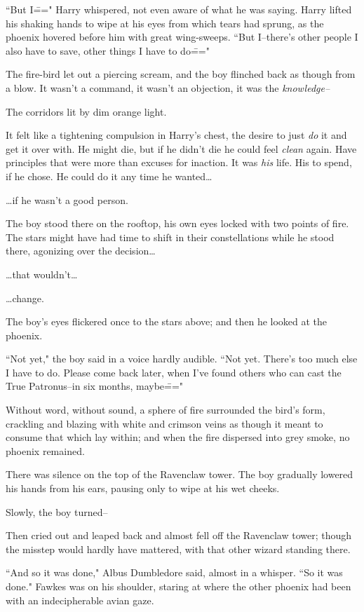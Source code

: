 ``But I\===" Harry whispered, not even aware of what he was saying. Harry lifted his shaking hands to wipe at his eyes from which tears had sprung, as the phoenix hovered before him with great wing-sweeps. ``But I\---there's other people I also have to save, other things I have to do\==="

The fire-bird let out a piercing scream, and the boy flinched back as though from a blow. It wasn't a command, it wasn't an objection, it was the \emph{knowledge\---}

The corridors lit by dim orange light.

It felt like a tightening compulsion in Harry's chest, the desire to just \emph{do} it and get it over with. He might die, but if he didn't die he could feel \emph{clean} again. Have principles that were more than excuses for inaction. It was \emph{his} life. His to spend, if he chose. He could do it any time he wanted{\ldots}

{\ldots}if he wasn't a good person.

\later

The boy stood there on the rooftop, his own eyes locked with two points of fire. The stars might have had time to shift in their constellations while he stood there, agonizing over the decision{\ldots}

{\ldots}that wouldn't{\ldots}

{\ldots}change.

The boy's eyes flickered once to the stars above; and then he looked at the phoenix.

``Not yet," the boy said in a voice hardly audible. ``Not yet. There's too much else I have to do. Please come back later, when I've found others who can cast the True Patronus\---in six months, maybe\==="

Without word, without sound, a sphere of fire surrounded the bird's form, crackling and blazing with white and crimson veins as though it meant to consume that which lay within; and when the fire dispersed into grey smoke, no phoenix remained.

There was silence on the top of the Ravenclaw tower. The boy gradually lowered his hands from his ears, pausing only to wipe at his wet cheeks.

Slowly, the boy turned\---

Then cried out and leaped back and almost fell off the Ravenclaw tower; though the misstep would hardly have mattered, with that other wizard standing there.

``And so it was done," Albus Dumbledore said, almost in a whisper. ``So it was done." Fawkes was on his shoulder, staring at where the other phoenix had been with an indecipherable avian gaze.

